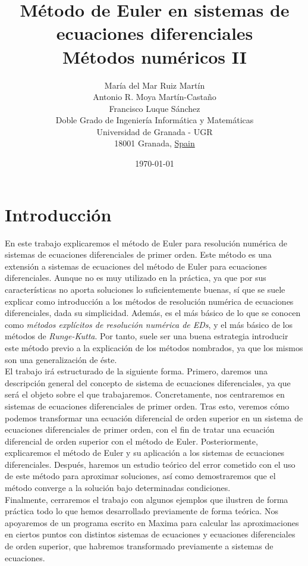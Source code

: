 \documentclass[12pt]{article}       %
\title{
    Método de Euler en sistemas de ecuaciones diferenciales \\              %
    \large Métodos numéricos II              %
}
\author{
        María del Mar Ruiz Martín \\
        Antonio R. Moya Martín-Castaño \\
        Francisco Luque Sánchez \\
        Doble Grado de Ingeniería Informática y Matemáticas\\
        Universidad de Granada - UGR\\
        18001 Granada, \underline{Spain}
}
\date{\today}
\begin{document}
\maketitle

\section{Introducción}

En este trabajo explicaremos el método de Euler para resolución numérica de sistemas de ecuaciones diferenciales de primer orden. Este método es una extensión a sistemas de ecuaciones del método de Euler para ecuaciones diferenciales. Aunque no es muy utilizado en la práctica, ya que por sus características no aporta soluciones lo suficientemente buenas, sí que se suele explicar como introducción a los métodos de resolución numérica de ecuaciones diferenciales, dada su simplicidad. Además, es el más básico de lo que se conocen como \textit{métodos explícitos de resolución numérica de EDs}, y el más básico de los métodos de \textit{Runge-Kutta}. Por tanto, suele ser una buena estrategia introducir este método previo a la explicación de los métodos nombrados, ya que los mismos son una generalización de éste.\\

El trabajo irá estructurado de la siguiente forma. Primero, daremos una descripción general del concepto de sistema de ecuaciones diferenciales, ya que será el objeto sobre el que trabajaremos. Concretamente, nos centraremos en sistemas de ecuaciones diferenciales de primer orden. Tras esto, veremos cómo podemos transformar una ecuación diferencial de orden superior en un sistema de ecuaciones diferenciales de primer orden, con el fin de tratar una ecuación diferencial de orden superior con el método de Euler. Posteriormente, explicaremos el método de Euler y su aplicación a los sistemas de ecuaciones diferenciales. Después, haremos un estudio teórico del error cometido con el uso de este método para aproximar soluciones, así como demostraremos que el método converge a la solución bajo determinadas condiciones.\\

Finalmente, cerraremos el trabajo con algunos ejemplos que ilustren de forma práctica todo lo que hemos desarrollado previamente de forma teórica. Nos apoyaremos de un programa escrito en Maxima para calcular las aproximaciones en ciertos puntos con distintos sistemas de ecuaciones y ecuaciones diferenciales de orden superior, que habremos transformado previamente a sistemas de ecuaciones.\\
\end{document}
